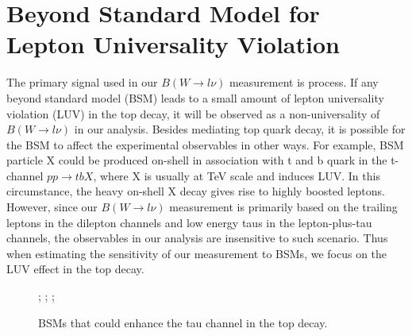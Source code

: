 

\section{Beyond Standard Model for Lepton Universality Violation}
\label{sec:relatedWorks:bsm}

The primary signal used in our $B(W\to l \nu )$ measurement is \ttbar process. If any beyond standard model (BSM) leads to a small amount of lepton universality violation (LUV) in the top decay, it will be observed as a non-universality of $B(W\to l \nu )$ in our analysis. Besides mediating top quark decay, it is possible for the BSM to affect the experimental observables in other ways. For example, BSM particle X could be produced on-shell in association with t and b quark in the t-channel $pp \to t b X$, where X is usually at TeV scale and induces LUV. In this circumstance, the heavy on-shell X decay gives rise to highly boosted leptons.  However, since our $B(W\to l \nu )$ measurement is primarily based on the trailing leptons in the dilepton channels and low energy taus in the lepton-plus-tau channels, the observables in our analysis are insensitive to such scenario. Thus when estimating the sensitivity of our measurement to BSMs, we focus on the LUV effect in the top decay. 

\begin{figure}[ht]
    \centering
    ;\qquad
    ;\qquad
    ;
    \caption{BSMs that could enhance the tau channel in the top decay. }
   \label{fig:relatedWorks:bsm:topdecayBSM}
\end{figure}

